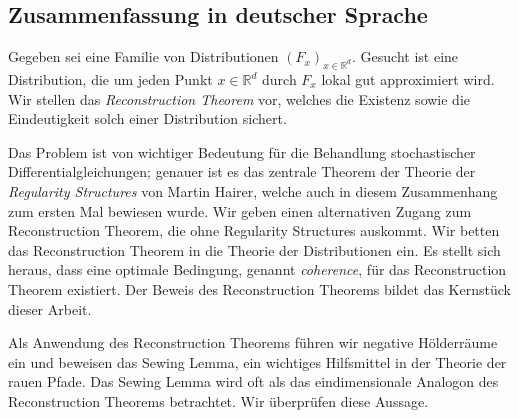 \documentclass[masters]{ucbthesis}
\theoremstyle{definition}
\begin{document}
\begin{alwayssingle}
\section*{Zusammenfassung in deutscher Sprache}

Gegeben sei eine Familie von Distributionen \( (F_x)_{x \in \mathbb{R}^d} \). Gesucht ist eine Distribution, die um jeden Punkt \( x \in \mathbb{R}^d \) durch \( F_x \) lokal gut approximiert wird. Wir stellen das \emph{Reconstruction Theorem} vor, welches die Existenz sowie die Eindeutigkeit solch einer Distribution sichert. 

Das Problem ist von wichtiger Bedeutung für die Behandlung stochastischer Differentialgleichungen; genauer ist es das zentrale Theorem der Theorie der \emph{Regularity Structures} von Martin Hairer, welche auch in diesem Zusammenhang zum ersten Mal bewiesen wurde. Wir geben einen alternativen Zugang zum Reconstruction Theorem, die ohne Regularity Structures auskommt. Wir betten das Reconstruction Theorem in die Theorie der Distributionen ein. Es stellt sich heraus, dass eine optimale Bedingung, genannt \emph{coherence}, für das Reconstruction Theorem existiert. Der Beweis des Reconstruction Theorems bildet das Kernstück dieser Arbeit. 

Als Anwendung des Reconstruction Theorems führen wir negative Hölderräume ein und beweisen das Sewing Lemma, ein wichtiges Hilfsmittel in der Theorie der rauen Pfade. Das Sewing Lemma wird oft als das eindimensionale Analogon des Reconstruction Theorems betrachtet. Wir überprüfen diese Aussage.

\end{alwayssingle}



\begin{frontmatter}


\tableofcontents
\clearpage


\end{frontmatter}

\pagestyle{headings}



% 






\printbibliography

\end{document}
